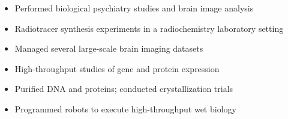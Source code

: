 \documentclass[10pt,a4paper]{altacv}
\begin{document}





\clearpage


\begin{itemize}
\item Performed biological psychiatry studies and brain image analysis
\item Radiotracer synthesis experiments in a radiochemistry laboratory setting  
\item Managed several large-scale brain imaging datasets
\end{itemize}

\divider



\begin{itemize}
\item High-throughput studies of gene and protein expression
\item Purified DNA and proteins; conducted crystallization trials
\item Programmed robots to execute high-throughput wet biology
\end{itemize}
\end{document}
